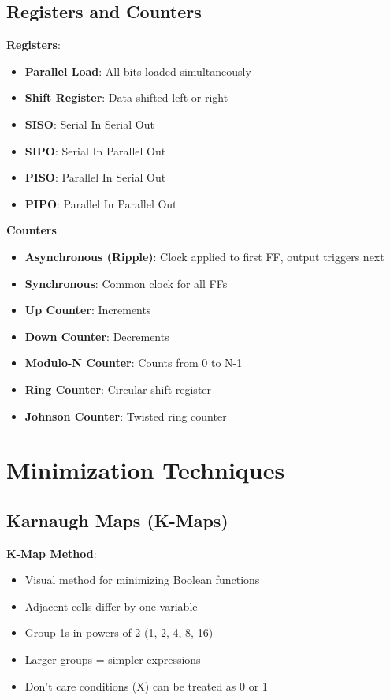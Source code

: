 \documentclass[12pt,a4paper]{report}
\begin{document}
\subsection{Registers and Counters}
\begin{concept}
\textbf{Registers}:
\begin{itemize}
    \item \textbf{Parallel Load}: All bits loaded simultaneously
    \item \textbf{Shift Register}: Data shifted left or right
    \item \textbf{SISO}: Serial In Serial Out
    \item \textbf{SIPO}: Serial In Parallel Out
    \item \textbf{PISO}: Parallel In Serial Out
    \item \textbf{PIPO}: Parallel In Parallel Out
\end{itemize}

\textbf{Counters}:
\begin{itemize}
    \item \textbf{Asynchronous (Ripple)}: Clock applied to first FF, output triggers next
    \item \textbf{Synchronous}: Common clock for all FFs
    \item \textbf{Up Counter}: Increments
    \item \textbf{Down Counter}: Decrements
    \item \textbf{Modulo-N Counter}: Counts from 0 to N-1
    \item \textbf{Ring Counter}: Circular shift register
    \item \textbf{Johnson Counter}: Twisted ring counter
\end{itemize}
\end{concept}

\section{Minimization Techniques}

\subsection{Karnaugh Maps (K-Maps)}
\begin{concept}
\textbf{K-Map Method}:
\begin{itemize}
    \item Visual method for minimizing Boolean functions
    \item Adjacent cells differ by one variable
    \item Group 1s in powers of 2 (1, 2, 4, 8, 16)
    \item Larger groups = simpler expressions
    \item Don't care conditions (X) can be treated as 0 or 1
\end{itemize}
\end{concept}
\end{document}
